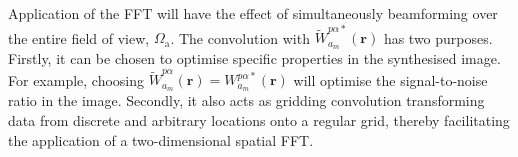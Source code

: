 \documentclass[
  journal=pasa,
  manuscript=article-type,
  year=2020,
  volume=37,
]{cup-journal}
\begin{document}

Application of the FFT will have the effect of simultaneously beamforming over the entire field of view, $\Omega_\textrm{a}$. The convolution with $\widetilde{W}_{a_m}^{p\alpha*}(\boldsymbol{r})$ has two purposes. Firstly, it can be chosen to optimise specific properties in the synthesised image. For example, choosing $\widetilde{W}_{a_m}^{p\alpha}(\boldsymbol{r})=W_{a_m}^{p\alpha*}(\boldsymbol{r})$ will optimise the signal-to-noise ratio in the image. Secondly, it also acts as gridding convolution transforming data from discrete and arbitrary locations onto a regular grid, thereby facilitating the application of a two-dimensional spatial FFT. 
\end{document}

